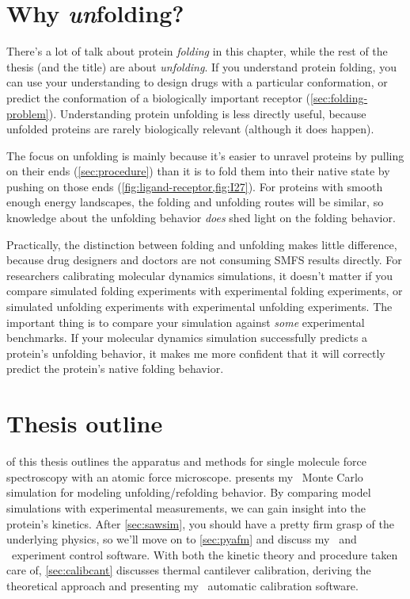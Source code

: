 \section{Why \emph{un}folding?}
\label{sec:unfolding}

There's a lot of talk about protein \emph{folding} in this chapter,
while the rest of the thesis (and the title) are about
\emph{unfolding}.  If you understand protein folding, you can use your
understanding to design drugs with a particular conformation, or
predict the conformation of a biologically important receptor
(\cref{sec:folding-problem}).  Understanding protein unfolding is less
directly useful, because unfolded proteins are rarely biologically
relevant (although it does happen\citep{dyson05}).

The focus on unfolding is mainly because it's easier to unravel
proteins by pulling on their ends (\cref{sec:procedure}) than it is to
fold them into their native state by pushing on those ends
(\cref{fig:ligand-receptor,fig:I27}).  For proteins with smooth enough
energy landscapes, the folding and unfolding routes will be similar,
so knowledge about the unfolding behavior \emph{does} shed light on
the folding behavior.

Practically, the distinction between folding and unfolding makes
little difference, because drug designers and doctors are not
consuming SMFS results directly.  For researchers calibrating
molecular dynamics simulations, it doesn't matter if you compare
simulated folding experiments with experimental folding experiments,
or simulated unfolding experiments with experimental unfolding
experiments.  The important thing is to compare your simulation
against \emph{some} experimental benchmarks.  If your molecular
dynamics simulation successfully predicts a protein's unfolding
behavior, it makes me more confident that it will correctly predict
the protein's native folding behavior.


\section{Thesis outline}
\label{sec:outline}

 of this thesis outlines the apparatus and methods
for single molecule force spectroscopy with an atomic force
microscope.   presents my \sawsim\ Monte Carlo
simulation for modeling unfolding/refolding behavior.  By comparing
model simulations with experimental measurements, we can gain insight
into the protein's kinetics.  After \cref{sec:sawsim}, you should have
a pretty firm grasp of the underlying physics, so we'll move on to
\cref{sec:pyafm} and discuss my \pyafm\ and \unfoldprotein\ experiment
control software.  With both the kinetic theory and procedure taken
care of, \cref{sec:calibcant} discusses thermal cantilever
calibration, deriving the theoretical approach and presenting my
\calibcant\ automatic calibration software.

